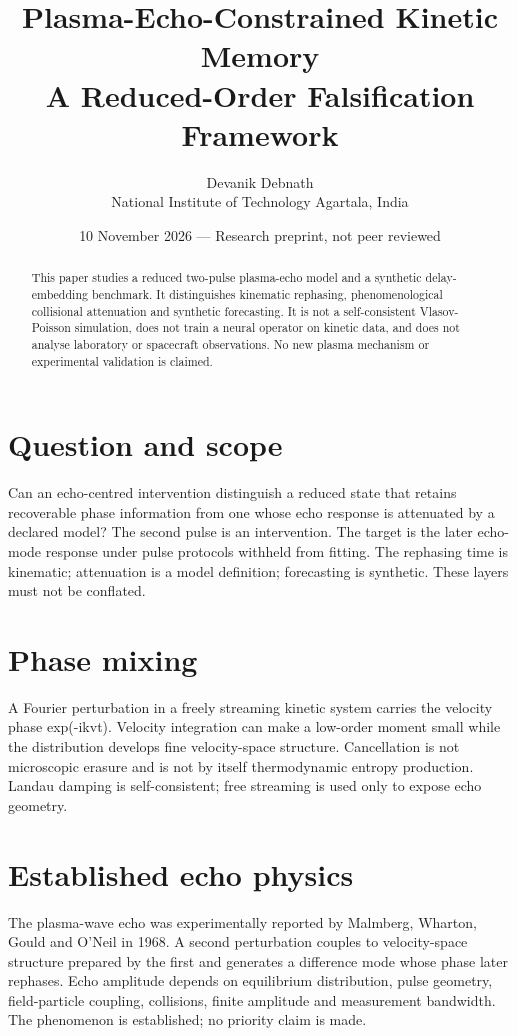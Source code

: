 \documentclass[11pt,a4paper]{article}
\title{Plasma-Echo-Constrained Kinetic Memory\\A Reduced-Order Falsification Framework}
\author{Devanik Debnath\\National Institute of Technology Agartala, India}
\date{10 November 2026 --- Research preprint, not peer reviewed}
\begin{document}
\maketitle
\begin{abstract}
This paper studies a reduced two-pulse plasma-echo model and a synthetic delay-embedding benchmark. It distinguishes kinematic rephasing, phenomenological collisional attenuation and synthetic forecasting. It is not a self-consistent Vlasov-Poisson simulation, does not train a neural operator on kinetic data, and does not analyse laboratory or spacecraft observations. No new plasma mechanism or experimental validation is claimed.
\end{abstract}
\newpage
\section{Question and scope}
Can an echo-centred intervention distinguish a reduced state that retains recoverable phase information from one whose echo response is attenuated by a declared model? The second pulse is an intervention. The target is the later echo-mode response under pulse protocols withheld from fitting. The rephasing time is kinematic; attenuation is a model definition; forecasting is synthetic. These layers must not be conflated.
\newpage
\section{Phase mixing}
A Fourier perturbation in a freely streaming kinetic system carries the velocity phase exp(-ikvt). Velocity integration can make a low-order moment small while the distribution develops fine velocity-space structure. Cancellation is not microscopic erasure and is not by itself thermodynamic entropy production. Landau damping is self-consistent; free streaming is used only to expose echo geometry.
\newpage
\section{Established echo physics}
The plasma-wave echo was experimentally reported by Malmberg, Wharton, Gould and O'Neil in 1968. A second perturbation couples to velocity-space structure prepared by the first and generates a difference mode whose phase later rephases. Echo amplitude depends on equilibrium distribution, pulse geometry, field-particle coupling, collisions, finite amplitude and measurement bandwidth. The phenomenon is established; no priority claim is made.
\cite{Malmberg1968,Ichikawa1969,Grenier2022}
\newpage
\end{document}
